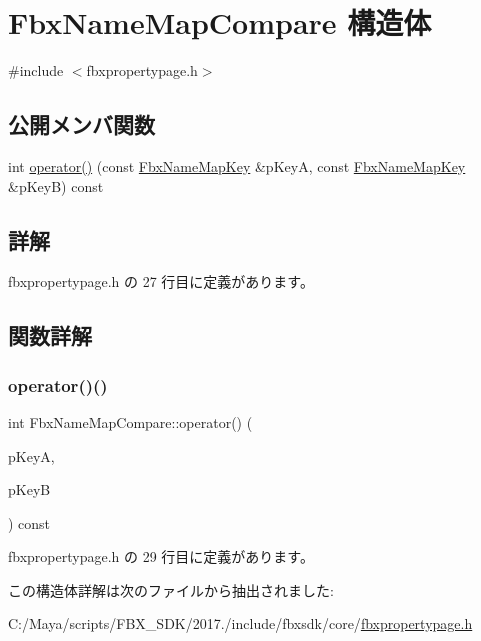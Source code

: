\hypertarget{struct_fbx_name_map_compare}{}\section{Fbx\+Name\+Map\+Compare 構造体}
\label{struct_fbx_name_map_compare}


{\ttfamily \#include $<$fbxpropertypage.\+h$>$}

\subsection*{公開メンバ関数}
\begin{DoxyCompactItemize}
\item 
int \hyperlink{struct_fbx_name_map_compare_a9c6332a9e8c2690ccb2ed5546649de86}{operator()} (const \hyperlink{fbxpropertypage_8h_a15e637bebd0ff80c69b74c533323c930}{Fbx\+Name\+Map\+Key} \&p\+KeyA, const \hyperlink{fbxpropertypage_8h_a15e637bebd0ff80c69b74c533323c930}{Fbx\+Name\+Map\+Key} \&p\+KeyB) const
\end{DoxyCompactItemize}


\subsection{詳解}


 fbxpropertypage.\+h の 27 行目に定義があります。



\subsection{関数詳解}
\mbox{\label{struct_fbx_name_map_compare_a9c6332a9e8c2690ccb2ed5546649de86}} 
\subsubsection{\texorpdfstring{operator()()}{operator()()}}
{\footnotesize\ttfamily int Fbx\+Name\+Map\+Compare\+::operator() (\begin{DoxyParamCaption}\item[{const \hyperlink{fbxpropertypage_8h_a15e637bebd0ff80c69b74c533323c930}{Fbx\+Name\+Map\+Key} \&}]{p\+KeyA,  }\item[{const \hyperlink{fbxpropertypage_8h_a15e637bebd0ff80c69b74c533323c930}{Fbx\+Name\+Map\+Key} \&}]{p\+KeyB }\end{DoxyParamCaption}) const\hspace{0.3cm}{\ttfamily [inline]}}



 fbxpropertypage.\+h の 29 行目に定義があります。



この構造体詳解は次のファイルから抽出されました\+:\begin{DoxyCompactItemize}
\item 
C\+:/\+Maya/scripts/\+F\+B\+X\+\_\+\+S\+D\+K/2017./include/fbxsdk/core/\hyperlink{fbxpropertypage_8h}{fbxpropertypage.\+h}\end{DoxyCompactItemize}
